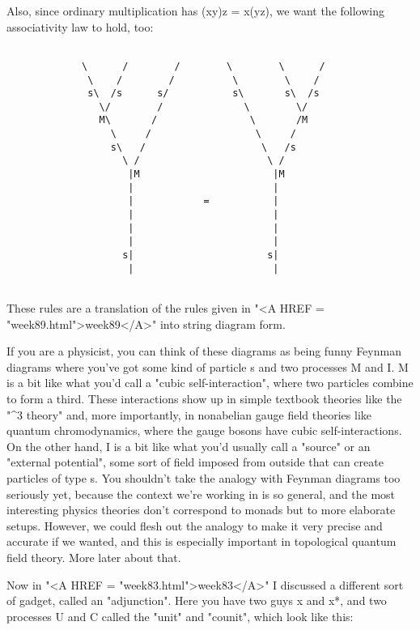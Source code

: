 Also, since ordinary multiplication has (xy)z = x(yz), we want
the following associativity law to hold, too:



\begin{verbatim}

             \      /        /        \        \      /
              \    /        /          \        \    /
              s\  /s      s/           s\       s\  /s
                \/        /              \        \/
                M\       /                \       /M 
                  \     /                  \     /
                  s\   /                    \   /s
                    \ /                      \ /
                     |M                       |M
                     |                        |
                     |            =           |
                     |                        |
                     |                        |
                     |                        |
                    s|                       s|
                     |                        |


\end{verbatim}
    
These rules are a translation of the rules given in "<A HREF = "week89.html">week89</A>" into
string diagram form.  

If you are a physicist, you can think of these diagrams as being funny
Feynman diagrams where you've got some kind of particle s and two
processes M and I.  M is a bit like what you'd call a "cubic
self-interaction", where two particles combine to form a third.  These
interactions show up in simple textbook theories like the "\phi ^{3} theory"
and, more importantly, in nonabelian gauge field theories like quantum
chromodynamics, where the gauge bosons have cubic self-interactions.  On 
the other hand, I is a bit like what you'd usually call a "source" or an 
"external potential", some sort of field imposed from outside that can 
create particles of type s.  You shouldn't take the analogy with Feynman
diagrams too seriously yet, because the context we're working in is so
general, and the most interesting physics theories don't correspond to
monads but to more elaborate setups.  However, we could flesh out the
analogy to make it very precise and accurate if we wanted, and this is
especially important in topological quantum field theory.  More later
about that.

Now in "<A HREF = "week83.html">week83</A>" I discussed a different sort of gadget, called an
"adjunction".   Here you have two guys x and x*, and two
processes  U and C called the "unit" and "counit", which look like
this:



